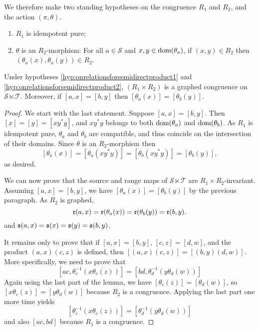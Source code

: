 We therefore make two standing hypotheses on the congruence $R_1$ and $R_2$, and the action $(\pi,\theta)$.

\begin{enumerate}[label=(H\arabic*)]
\item\label{hyp:onrelationsforsemidirectproduct1} $R_1$ is idempotent pure;
\item\label{hyp:onrelationsforsemidirectproduct2} $\theta$ is an $R_2$-morphism: For all $a\in\mathcal{S}$ and $x,y\in\operatorname{dom}(\theta_a)$, if $(x,y)\in R_2$ then $(\theta_a(x),\theta_a(y))\in R_2$.
\end{enumerate}

\begin{lemma}\label{lem:hypmakeformulasgood}
Under hypotheses \ref{hyp:onrelationsforsemidirectproduct1} and \ref{hyp:onrelationsforsemidirectproduct2}, $(R_1\times R_2)$ is a graphed congruence on $\mathcal{S}\ltimes\mathcal{T}$. Moreover, if $[a,x]=[b,y]$ then $[\theta_a(x)]=[\theta_b(y)]$.
\end{lemma}
\begin{proof}
    We start with the last statement. Suppose $[a,x]=[b,y]$. Then
    $[x]=[y]=[xy^*y]$, and $xy^*y$ belongs to both $\operatorname{dom}(\theta_a)$ and $\operatorname{dom}(\theta_b)$. As $R_1$ is idempotent pure, $\theta_a$ and $\theta_b$ are compatible, and thus coincide on the intersection of their domains. Since $\theta$ is an $R_2$-morphism then
    \[[\theta_a(x)]=[\theta_a(xy^*y)]=[\theta_b(xy^*y)]=[\theta_b(y)],\]
    as desired.
    
    We can now prove that the source and range maps of $\mathcal{S}\ltimes\mathcal{T}$ are $R_1\times R_2$-invariant. Assuming $[a,x]=[b,y]$, we have $[\theta_a(x)]=[\theta_b(y)]$ by the previous paragraph. As $R_2$ is graphed,
    \[\operatorname{\mathfrak{r}}(a,x)=\operatorname{\mathfrak{r}}(\theta_a(x))=\operatorname{\mathfrak{r}}(\theta_b(y))=\operatorname{\mathfrak{r}}(b,y).\]
    and $\operatorname{\mathfrak{s}}(a,x)=\operatorname{\mathfrak{s}}(x)=\operatorname{\mathfrak{s}}(y)=\operatorname{\mathfrak{s}}(b,y)$.
    
    It remains only to prove that if $[a,x]=[b,y]$, $[c,z]=[d,w]$, and the product $(a,x)(c,z)$ is defined, then $[(a,x)(c,z)]=[(b,y)(d,w)]$. More specifically, we need to prove that
    \[[ac,\theta_c^{-1}(x\theta_c(z))]=[bd,\theta_d^{-1}(y\theta_d(w))]\]
    Again using the last part of the lemma, we have $[\theta_c(z)]=[\theta_d(w)]$, so $[x\theta_c(z)]=[y\theta_d(w)]$ because $R_2$ is a congruence. Applying the last part one more time yields
    \[[\theta_c^{-1}(x\theta_c(z))]=[\theta_d^{-1}(y\theta_d(w))]\]
    and also $[ac,bd]$ because $R_1$ is a congruence.\qedhere
\end{proof}

